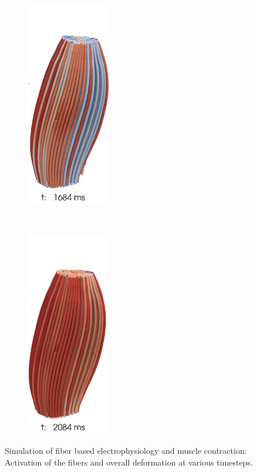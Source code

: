 \begin{figure}
\begin{subfigure}[t]{0.25\textwidth}
    \includegraphics[height=9cm]{images/results/application/contraction_fibers_1684b.png}%
    \caption{}%
    \label{fig:contraction_fibers_1684b}%
  \end{subfigure}\,
  \begin{subfigure}[t]{0.2\textwidth}%
    \centering%
    \includegraphics[height=9cm]{images/results/application/contraction_fibers_2084b.png}%
    \caption{}%
    \label{fig:contraction_fibers_2084b}%
  \end{subfigure}
  \caption{Simulation of fiber based electrophysiology and muscle contraction: Activation of the fibers and overall deformation at various timesteps.}%
  \label{fig:contraction_fibers_1}%
\end{figure}%

